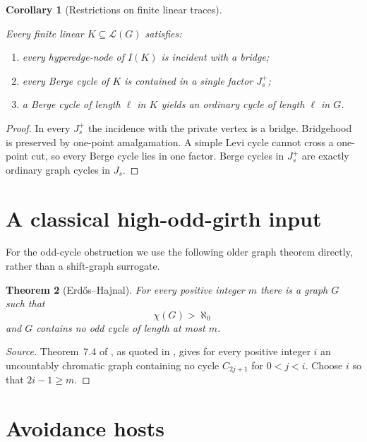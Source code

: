 \documentclass[a4paper,11pt,reqno]{amsart}
\providecommand{\tightlist}{\setlength{\itemsep}{0pt}\setlength{\parskip}{0pt}}
\theoremstyle{plain}
\newtheorem{theorem}{Theorem}[section]
\newtheorem{corollary}[theorem]{Corollary}
\theoremstyle{definition}
\theoremstyle{remark}
\begin{document}
\begin{corollary}[Restrictions on finite linear traces]\label{corollary-6.4-restrictions-on-finite-linear-traces}

Every finite linear \(K\subseteq\mathcal L(G)\) satisfies:

\begin{enumerate}
\def\labelenumi{\arabic{enumi}.}
\tightlist
\item
  every hyperedge-node of \(I(K)\) is incident with a bridge;
\item
  every Berge cycle of \(K\) is contained in a single factor \(J_s^+\);
\item
  a Berge cycle of length \(\ell\) in \(K\) yields an ordinary cycle of length \(\ell\) in \(G\).
\end{enumerate}

\end{corollary}
\begin{proof}
In every \(J_s^+\) the incidence with the private vertex is a bridge. Bridgehood is preserved by one-point amalgamation. A simple Levi cycle cannot cross a one-point cut, so every Berge cycle lies in one factor. Berge cycles in \(J_s^+\) are exactly ordinary graph cycles in \(J_s\).
\end{proof}

\section{A classical high-odd-girth input}\label{uncountably-chromatic-graphs-of-large-odd-girth}

For the odd-cycle obstruction we use the following older graph theorem
directly, rather than a shift-graph surrogate.

\begin{theorem}[Erdős--Hajnal]\label{theorem-7.1-high-odd-girth}
For every positive integer $m$ there is a graph $G$ such that
\[
\chi(G)>\aleph_0
\]
and $G$ contains no odd cycle of length at most $m$.
\end{theorem}

\begin{proof}[Source]
Theorem~7.4 of \citet[p.~76]{erdoshajnal1966}, as quoted in
\citet[Theorem~C, p.~428]{egh1975}, gives for every positive integer $i$ an
uncountably chromatic graph containing no cycle $C_{2j+1}$ for $0<j<i$.
Choose $i$ so that $2i-1\ge m$.
\end{proof}

\section{Avoidance hosts}\label{the-avoidance-hosts}
\end{document}
